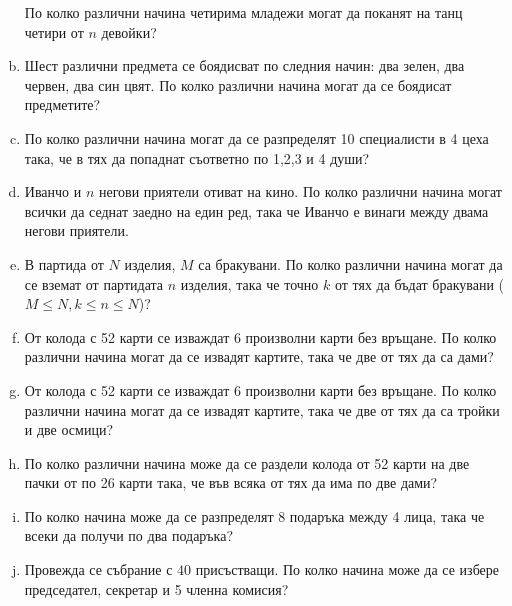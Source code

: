 \begin{problem}
\begin{enumerate}[a)]
    По колко различни начина четирима младежи могат да поканят на танц четири от $n$ девойки?
  \item
    Шест различни предмета се боядисват по следния начин: два зелен, два червен, два син цвят.
    По колко различни начина могат да се боядисат предметите?  
  \item
    По колко различни начина могат да се разпределят 10 специалисти в 4 цеха така, че в тях да попаднат съответно по 1,2,3 и 4 души?
  \item
    Иванчо и $n$ негови приятели отиват на кино.
    По колко различни начина могат всички да седнат заедно на един ред, така че Иванчо е винаги
    между двама негови приятели.
  \item
    В партида от $N$ изделия, $M$ са бракувани.
    По колко различни начина могат да се вземат от партидата $n$ изделия, така че точно $k$ от тях да бъдат бракувани ($M\leq N, k\leq n\leq N$)?
  \item
    От колода с 52 карти се изваждат 6 произволни карти без връщане.
    По колко различни начина могат да се извадят картите, така че две от тях да са дами?
  \item
    От колода с 52 карти се изваждат 6 произволни карти без връщане.
    По колко различни начина могат да се извадят картите, така че две от тях да са тройки и две осмици?
  \item
    По колко различни начина може да се раздели колода от 52 карти на две пачки от по 26 карти така, че във всяка от тях да има по две дами?
  \item
    По колко начина може да се разпределят 8 подаръка между 4 лица, така че всеки да получи по два подаръка?
  \item
    Провежда се събрание с $40$ присъстващи.
    По колко начина може да се избере председател, секретар и 5 членна комисия?
  \end{enumerate}
\end{problem}



